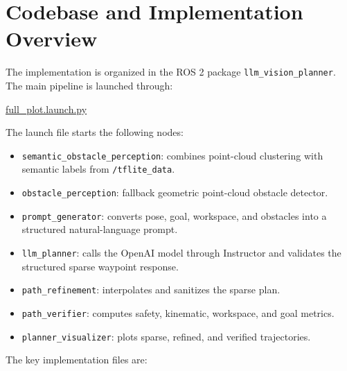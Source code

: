 \documentclass[11pt]{article}
\begin{document}
\section{Codebase and Implementation Overview}

The implementation is organized in the ROS 2 package \texttt{llm\_vision\_planner}. The main pipeline is launched through:

\begin{center}
\href{https://github.com/prachitgupta/starling_testing_ws/blob/main/src/llm_vision_planner/launch/full_plot.launch.py}{full\_plot.launch.py}
\end{center}

The launch file starts the following nodes:

\begin{itemize}
  \item \texttt{semantic\_obstacle\_perception}: combines point-cloud clustering with semantic labels from \texttt{/tflite\_data}.
  \item \texttt{obstacle\_perception}: fallback geometric point-cloud obstacle detector.
  \item \texttt{prompt\_generator}: converts pose, goal, workspace, and obstacles into a structured natural-language prompt.
  \item \texttt{llm\_planner}: calls the OpenAI model through Instructor and validates the structured sparse waypoint response.
  \item \texttt{path\_refinement}: interpolates and sanitizes the sparse plan.
  \item \texttt{path\_verifier}: computes safety, kinematic, workspace, and goal metrics.
  \item \texttt{planner\_visualizer}: plots sparse, refined, and verified trajectories.
\end{itemize}

The key implementation files are:
\end{document}

